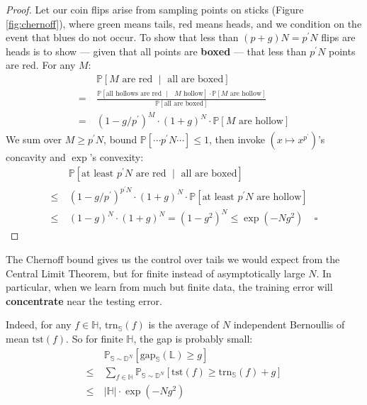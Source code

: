 \documentclass[11pt, justified]{tufte-book}
\newcommand{\Ein}  {\text{trn}_{\Ss}}
\newcommand{\Egap} {\text{gap}_{\Ss}}
\newcommand{\Eout} {\text{tst}}
\newcommand{\Dd}{\mathbb{D}}\newcommand{\dD}{\mathcal{D}}
\newcommand{\Hh}{\mathbb{H}}\newcommand{\hH}{\mathcal{H}}
\newcommand{\Ll}{\mathbb{L}}\newcommand{\lL}{\mathcal{L}}
\newcommand{\Pp}{\mathbb{P}}\newcommand{\pP}{\mathcal{P}}
\newcommand{\Ss}{\mathbb{S}}\newcommand{\sS}{\mathcal{S}}
\theoremstyle{definition}
\begin{document}
        \begin{proof} \renewcommand{\qedsymbol}{}
            Let our coin flips arise from sampling points on sticks
            (Figure \ref{fig:chernoff}), where green means tails, red
            means heads, and we condition on the event that blues do not occur.
            To show that less than $(p+g)N = p^\prime N$ flips are
            heads is to show --- given that all points are \textbf{boxed} ---
            that less than $p^\prime N$ points are red. 
            For any $M$:
            {%
            \begin{align*}
                    & ~ \Pp[\text{$M$ are red $\mid$ all are boxed}] \\
                  = & ~ \frac{\Pp[\text{all hollows are red $\mid$ $M$ hollow}] \cdot \Pp[\text{$M$ are hollow}]}{\Pp[\text{all are boxed}] } \\
                  = & ~ (1 - g/p^\prime)^{M} \cdot (1+g)^{N} \cdot \Pp[\text{$M$ are hollow}]
            \end{align*}
            }%
            We sum over $M\geq p^\prime N$, bound $\Pp[\cdots p^\prime N \cdots] \leq 1$,
            then invoke $(x \mapsto x^{p^\prime})$'s concavity and
            $\exp$'s convexity:
            \begin{align*}
                &~\Pp[\text{at least $p^\prime N$ are red $\mid$ all are boxed}]
                \\ \leq
                &~(1 - g/p^\prime)^{p^\prime N} \cdot (1+g)^{N} \cdot \Pp[\text{at least $p^\prime N$ are hollow}]
                \\ \leq
                &~(1 - g)^N \cdot (1 + g)^{N}
                =
                (1 - g^2)^N
                \leq
                \exp(- Ng^2)
                ~~~~~\square
            \end{align*}
        \end{proof}
        \vspace{-0.5cm}
        The Chernoff bound gives us the control over tails we would expect from the
        Central Limit Theorem, but for finite instead of asymptotically large
        $N$.  In particular, when we learn from much but finite data, the
        training error will \textbf{concentrate} near the testing error.

        Indeed, for any $f\in \Hh$, $\Ein(f)$ is the average of $N$ independent 
        Bernoullis of mean $\Eout(f)$.  So for finite $\Hh$, the gap is
        probably small:
        \begin{align*}
            &~\Pp_{\Ss\sim \Dd^N}[\Egap(\Ll) \geq g] \\
            \leq 
            &~\sum_{f\in \Hh} \Pp_{\Ss\sim \Dd^N}[\Eout(f) \geq \Ein(f) + g] \\
            \leq
            &~|\Hh| \cdot \exp(-Ng^2)
        \end{align*}
\end{document}
